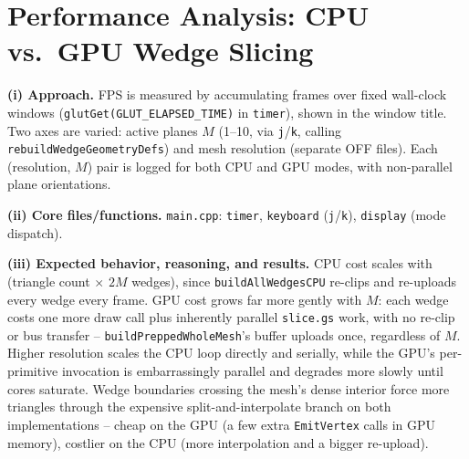 \documentclass[10pt]{article}
\begin{document}
\section{Performance Analysis: CPU vs.\ GPU Wedge Slicing}
\textbf{(i) Approach.} FPS is measured by accumulating frames over fixed wall-clock windows (\texttt{glutGet(GLUT\_ELAPSED\_TIME)} in \texttt{timer}), shown in the window title. Two axes are varied: active planes $M$ (1--10, via \texttt{j}/\texttt{k}, calling \texttt{rebuildWedgeGeometryDefs}) and mesh resolution (separate OFF files). Each (resolution, $M$) pair is logged for both CPU and GPU modes, with non-parallel plane orientations.

\textbf{(ii) Core files/functions.} \texttt{main.cpp}: \texttt{timer}, \texttt{keyboard} (\texttt{j}/\texttt{k}), \texttt{display} (mode dispatch).

\textbf{(iii) Expected behavior, reasoning, and results.} CPU cost scales with (triangle count $\times$ $2M$ wedges), since \texttt{buildAllWedgesCPU} re-clips and re-uploads every wedge every frame. GPU cost grows far more gently with $M$: each wedge costs one more draw call plus inherently parallel \texttt{slice.gs} work, with no re-clip or bus transfer -- \texttt{buildPreppedWholeMesh}'s buffer uploads once, regardless of $M$. Higher resolution scales the CPU loop directly and serially, while the GPU's per-primitive invocation is embarrassingly parallel and degrades more slowly until cores saturate. Wedge boundaries crossing the mesh's dense interior force more triangles through the expensive split-and-interpolate branch on both implementations -- cheap on the GPU (a few extra \texttt{EmitVertex} calls in GPU memory), costlier on the CPU (more interpolation and a bigger re-upload).


\end{document}
